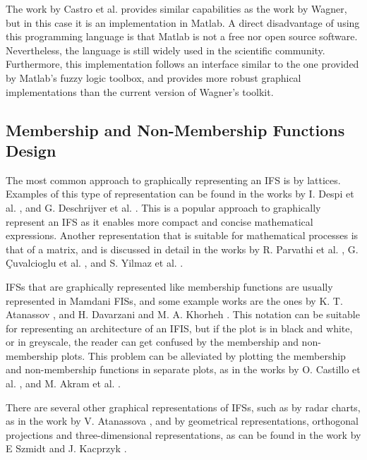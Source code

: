 The work by Castro et al. \cite{castro2007interval} provides similar
capabilities as the work by Wagner, but in this case it is an implementation in
Matlab. A direct disadvantage of using this programming language is that Matlab
is not a free nor open source software.  Nevertheless, the language is still
widely used in the scientific community. Furthermore, this implementation
follows an interface similar to the one provided by Matlab's fuzzy logic
toolbox, and provides more robust graphical implementations than the current
version of Wagner's toolkit.


\subsection{Membership and Non-Membership Functions Design}
\label{subsection:related-work-membership-and-non-membership-functions-design}

The most common approach to graphically representing an IFS is by
lattices. Examples of this type of representation can be found in the works by
I. Despi et al. \cite{Despi2013}, and G. Deschrijver et
al. \cite{Deschrijver2004}. This is a popular approach to graphically represent
an IFS as it enables more compact and concise mathematical expressions. Another
representation that is suitable for mathematical processes is that of a matrix,
and is discussed in detail in the works by R. Parvathi et al. \cite{Parvathi2014},
G. Çuvalcioglu et al. \cite{Yilmaz2015}, and S. Yilmaz et al. \cite{Yilmaz2015a}.

IFSs that are graphically represented like membership functions are usually
represented in Mamdani FISs, and some example works are the ones by
K. T. Atanassov \cite{Atanassov1986}, and H. Davarzani and M. A. Khorheh
\cite{Davarzani2013}. This notation can be suitable for representing an
architecture of an IFIS, but if the plot is in black and white, or in greyscale,
the reader can get confused by the membership and non-membership plots. This
problem can be alleviated by plotting the membership and non-membership
functions in separate plots, as in the works by O. Castillo et
al. \cite{castillo2007intuitionistic}, and M. Akram et al. \cite{Akram2014}.

There are several other graphical representations of IFSs, such as by radar
charts, as in the work by V. Atanassova \cite{Atanassova2010}, and by
geometrical representations, orthogonal projections and three-dimensional
representations, as can be found in the work by E Szmidt and J. Kacprzyk
\cite{Szmidt2000}.

